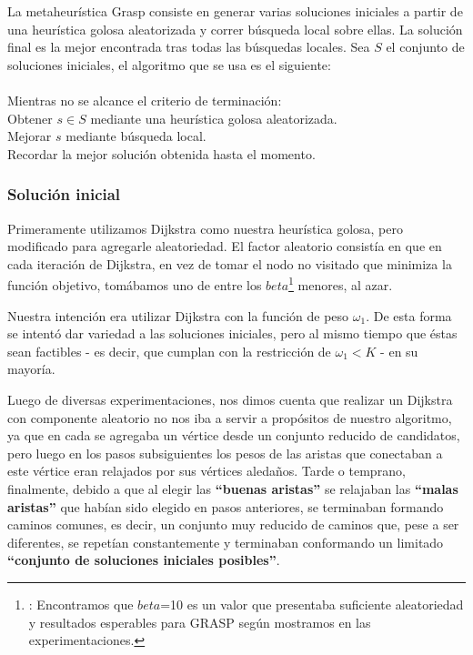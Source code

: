 La metaheurística Grasp consiste en generar varias soluciones iniciales a partir de una heurística golosa aleatorizada y correr búsqueda local sobre ellas. La solución final es la mejor encontrada tras todas las búsquedas locales.
Sea $S$ el conjunto de soluciones iniciales, el algoritmo que se usa es el siguiente:\\\\
\hspace*{1 cm} Mientras no se alcance el criterio de terminación:\\
\hspace*{2 cm} Obtener $s \in S$ mediante una heurística golosa aleatorizada.\\
\hspace*{2 cm} Mejorar $s$ mediante búsqueda local.\\
\hspace*{2 cm} Recordar la mejor solución obtenida hasta el momento.\\
\subsubsection{Solución inicial}

Primeramente utilizamos Dijkstra como nuestra heurística golosa, pero modificado para agregarle aleatoriedad. El factor aleatorio consistía en que en cada iteración de Dijkstra, en vez de tomar el nodo no visitado que minimiza la función objetivo, tomábamos uno de entre los $beta$\footnote{\label{$beta$}: Encontramos que $beta$=10 es un valor que presentaba suficiente aleatoriedad y resultados esperables para GRASP según mostramos en las experimentaciones.} menores, al azar.

Nuestra intención era utilizar Dijkstra con la función de peso $\omega_1$. De esta forma se intentó dar variedad a las soluciones iniciales, pero al mismo tiempo que éstas sean factibles - es decir, que cumplan con la restricción de $\omega_1 < K$ - en su mayoría.

Luego de diversas experimentaciones, nos dimos cuenta que realizar un Dijkstra con componente aleatorio no nos iba a servir a propósitos de nuestro algoritmo, ya que en cada se agregaba un vértice desde un conjunto reducido de candidatos, pero luego en los pasos subsiguientes los pesos de las aristas que conectaban a este vértice eran relajados por sus vértices aledaños. Tarde o temprano, finalmente, debido a que al elegir las \textbf{``buenas aristas''} se relajaban las \textbf{``malas aristas''} que habían sido elegido en pasos anteriores, se terminaban formando caminos comunes, es decir, un conjunto muy reducido de caminos que, pese a ser diferentes, se repetían constantemente y terminaban conformando un limitado \textbf{``conjunto de soluciones iniciales posibles''}.

